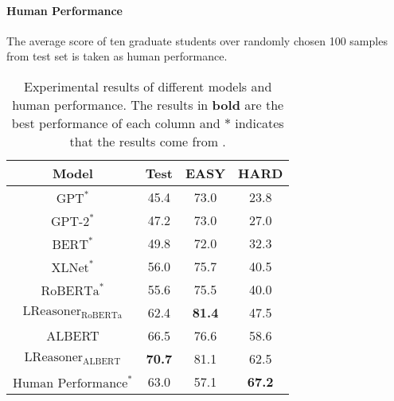 \documentclass[11pt,a4paper]{article}
\begin{document}
\paragraph{Human Performance} The average score of ten graduate students over randomly chosen 100 samples from test set is taken as human performance.
\begin{table}[!th]
    \setlength\tabcolsep{5pt}
    \newcommand{\tabincell}[2]{\begin{tabular}{@{}#1@{}}#2\end{tabular}}
	\centering
	\begin{tabular}{c|ccc}
    \toprule
    \bf Model & \bf Test & \bf EASY & \bf HARD \\
	\midrule 
    $\text{GPT}^*$ & 45.4 & 73.0 & 23.8 \\
    $\text{GPT-2}^*$ & 47.2 & 73.0 & 27.0 \\
    $\text{BERT}^*$ & 49.8 & 72.0 & 32.3 \\
    $\text{XLNet}^*$ & 56.0 & 75.7 & 40.5 \\
	\midrule 
    $\text{RoBERTa}^*$ & 55.6 & 75.5 & 40.0 \\
    $\text{LReasoner}_{\text{RoBERTa}}$ & 62.4 & \bf 81.4 & 47.5 \\
	\midrule 
    ALBERT & 66.5 & 76.6 & 58.6 \\
    $\text{LReasoner}_{\text{ALBERT}}$ & \bf 70.7 & 81.1 & 62.5 \\
	\midrule  
	$\text{Human Performance}^*$ & 63.0 & 57.1 & \bf 67.2 \\
	\bottomrule
 	\end{tabular}
	\caption{Experimental results of different models and human performance. The results in \textbf{bold} are the best performance of each column and $*$ indicates that the results come from \citet{yu2020reclor}.}
	\label{table_result_1}
\end{table}
\end{document}
